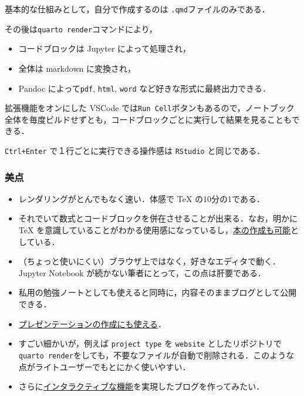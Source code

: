 \documentclass[
]{ltjsarticle}
\providecommand{\tightlist}{%
  \setlength{\itemsep}{0pt}\setlength{\parskip}{0pt}}\usepackage{longtable,booktabs,array}
\begin{document}
基本的な仕組みとして，自分で作成するのは
\texttt{.qmd}ファイルのみである．

その後は\texttt{quarto\ render}コマンドにより，

\begin{tcolorbox}[enhanced jigsaw, bottomrule=.15mm, leftrule=.75mm, colframe=quarto-callout-important-color-frame, opacityback=0, toprule=.15mm, colback=white, arc=.35mm, breakable, rightrule=.15mm, left=2mm]

\begin{itemize}
\tightlist
\item
  コードブロックは Jupyter によって処理され，
\item
  全体は markdown に変換され，
\item
  Pandoc によって\texttt{pdf}, \texttt{html}, \texttt{word}
  など好きな形式に最終出力できる．
\end{itemize}

\end{tcolorbox}

拡張機能をオンにした VSCode
では\texttt{Run\ Cell}ボタンもあるので，ノートブック全体を毎度ビルドせずとも，コードブロックごとに実行して結果を見ることもできる．

\texttt{Ctrl+Enter} で１行ごとに実行できる操作感は \texttt{RStudio}
と同じである．

\subsubsection{美点}\label{ux7f8eux70b9}

\begin{tcolorbox}[enhanced jigsaw, bottomrule=.15mm, leftrule=.75mm, colframe=quarto-callout-tip-color-frame, opacityback=0, toprule=.15mm, colback=white, arc=.35mm, breakable, rightrule=.15mm, left=2mm]

\begin{itemize}
\tightlist
\item
  レンダリングがとんでもなく速い．体感で TeX の10分の1である．
\item
  それでいて数式とコードブロックを併在させることが出来る．なお，明かに
  TeX
  を意識していることがわかる使用感になっているし，\href{https://quarto.org/docs/books/}{本の作成も可能}としている．
\item
  （ちょっと使いにくい）ブラウザ上ではなく，好きなエディタで動く．Jupyter
  Notebook が続かない筆者にとって，この点は肝要である．
\item
  私用の勉強ノートとしても使えると同時に，内容そのままブログとして公開できる．
\item
  \href{https://quarto.org/docs/presentations/}{プレゼンテーションの作成にも使える}．
\item
  すごい細かいが，例えば \texttt{project\ type} を \texttt{website}
  としたリポジトリで\texttt{quarto\ render}をしても，不要なファイルが自動で削除される．このような点がライトユーザーでもとにかく使いやすい．
\item
  さらに\href{https://quarto.org/docs/interactive/}{インタラクティブな機能}を実現したブログを作ってみたい．
\end{itemize}

\end{tcolorbox}
\end{document}
